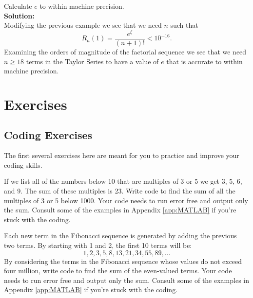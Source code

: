 \begin{example}
    Calculate $e$ to within machine precision. \\{\bf Solution:}\\
    Modifying the previous example we see that we need $n$ such that 
    \[ R_n(1) = \frac{e^\xi}{(n+1)!} < 10^{-16}. \]
    Examining the orders of magnitude of the factorial sequence we see that we need $n \ge
    18$ terms in the Taylor Series to have a value of $e$ that is accurate to within
    machine precision.
\end{example}


\newpage\section{Exercises}

\subsection{Coding Exercises}
The first several exercises here are meant for you to practice and improve your coding
skills.  

\begin{problem}
    If we list all of the numbers below 10 that are multiples of 3 or 5 we get 3, 5, 6,
    and 9.  The sum of these multiples is 23.  Write code to find the sum of all the
    multiples of 3 or 5 below 1000.  Your code needs to run error free and output only the
    sum.  Consult some of the examples in Appendix \ref{app:MATLAB} if you're stuck with
    the coding.
\end{problem}


\begin{problem}
    Each new term in the Fibonacci sequence is generated by adding the previous two terms.
    By starting with 1 and 2, the first 10 terms will be:
    \[ 1, 2, 3, 5, 8, 13, 21, 34, 55, 89, \dots \]
    By considering the terms in the Fibonacci sequence whose values do not exceed four
    million, write code to find the sum of the even-valued terms. Your code needs to run
    error free and output only the sum.  Consult some of the examples in Appendix \ref{app:MATLAB} if you're stuck with
    the coding.
\end{problem}

